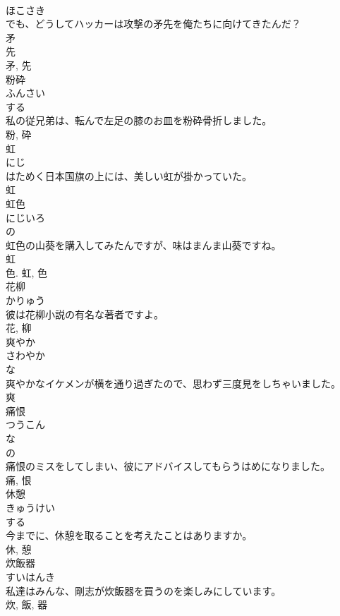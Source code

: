 \documentclass[8pt]{extreport}
\begin{document}
\begin{CJK}{UTF8}{min}
\\	ほこさき	
\\	でも、どうしてハッカーは攻撃の矛先を俺たちに向けてきたんだ？	
\\	矛 
\\	先 
\\	矛, 先	
\\	粉砕	
\\	ふんさい	
\\	する 
\\	私の従兄弟は、転んで左足の膝のお皿を粉砕骨折しました。	
\\	粉, 砕	
\\	虹	
\\	にじ	
\\	はためく日本国旗の上には、美しい虹が掛かっていた。	
\\	虹	
\\	虹色	
\\	にじいろ	
\\	の 
\\	虹色の山葵を購入してみたんですが、味はまんま山葵ですね。	
\\	虹 
\\	色.	虹, 色	
\\	花柳	
\\	かりゅう	
\\	彼は花柳小説の有名な著者ですよ。	
\\	花, 柳	
\\	爽やか	
\\	さわやか	
\\	な 
\\	爽やかなイケメンが横を通り過ぎたので、思わず三度見をしちゃいました。	
\\	爽	
\\	痛恨	
\\	つうこん	
\\	な 
\\	の 
\\	痛恨のミスをしてしまい、彼にアドバイスしてもらうはめになりました。	
\\	痛, 恨	
\\	休憩	
\\	きゅうけい	
\\	する 
\\	今までに、休憩を取ることを考えたことはありますか。	
\\	休, 憩	
\\	炊飯器	
\\	すいはんき	
\\	私達はみんな、剛志が炊飯器を買うのを楽しみにしています。	
\\	炊, 飯, 器	

\end{CJK}
\end{document}
